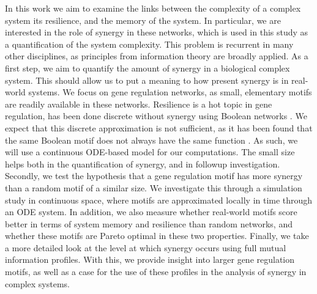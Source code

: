 \documentclass[../main.tex]{subfiles}
\begin{document}
In this work we aim to examine the links between the complexity of a complex system its resilience, and the memory of the system.
In particular, we are interested in the role of synergy in these networks, which is used in this study as a quantification of the system complexity.
This problem is recurrent in many other disciplines, as principles from information theory are broadly applied.
As a first step, we aim to quantify the amount of synergy in a biological complex system.
This should allow us to put a meaning to how present synergy is in real-world systems.
We focus on gene regulation networks, as small, elementary motifs are readily available in these networks.
Resilience is a hot topic in gene regulation, has been done discrete without synergy using Boolean networks \cite{peixoto2012emergence}.
We expect that this discrete approximation is not sufficient, as it has been found that the same Boolean motif does not always have the same function \cite{Gokhref}.
As such, we will use a continuous ODE-based model for our computations.
The small size helps both in the quantification of synergy, and in followup investigation.
Secondly, we test the hypothesis that a gene regulation motif has more synergy than a random motif of a similar size. 
We investigate this through a simulation study in continuous space, where motifs are approximated locally in time through an ODE system.
In addition, we also measure whether real-world motifs score better in terms of system memory and resilience than random networks, and whether these motifs are Pareto optimal in these two properties.
Finally, we take a more detailed look at the level at which synergy occurs using full mutual information profiles.
With this, we provide insight into larger gene regulation motifs, as well as a case for the use of these profiles in the analysis of synergy in complex systems.
\end{document}
